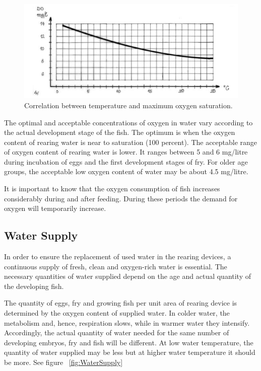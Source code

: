 \begin{figure}[H]
  \centering
   \includegraphics[scale = 0.5]{images/OxygenTemp.png}
  \caption{ Correlation between temperature and maximum oxygen saturation.}
   \label{fig:OxygenTemp}
\end{figure}


The optimal and acceptable concentrations of oxygen in water vary according to the actual development stage of the fish. The optimum is when the oxygen content of rearing water is near to saturation (100 percent). The acceptable range of oxygen content of rearing water is lower. It ranges between 5 and 6 mg/litre during incubation of eggs and the first development stages of fry. For older age groups, the acceptable low oxygen content of water may be about 4.5 mg/litre.

It is important to know that the oxygen consumption of fish increases considerably during and after feeding. During these periods the demand for oxygen will temporarily increase.

\subsection{Water Supply}

In order to ensure the replacement of used water in the rearing devices, a continuous supply of fresh, clean and oxygen-rich water is essential. The necessary quantities of water supplied depend on the age and actual quantity of the developing fish.

The quantity of eggs, fry and growing fish per unit area of rearing device is determined by the oxygen content of supplied water. In colder water, the metabolism and, hence, respiration slows, while in warmer water they intensify. Accordingly, the actual quantity of water needed for the same number of developing embryos, fry and fish will be different. At low water temperature, the quantity of water supplied may be less but at higher water temperature it should be more. See figure ~\ref{fig:WaterSupply} 

